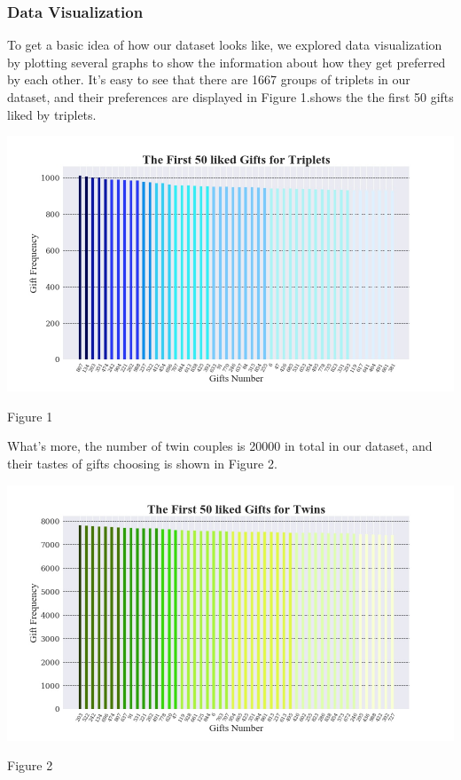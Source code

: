 \documentclass[12pt]{article}
\begin{document}
\subsubsection{Data Visualization}
To get a basic idea of how our dataset looks like, we explored data visualization by plotting several graphs to show the information about how they get preferred by each other.
It's easy to see that there are 1667 groups of triplets in our dataset, and their preferences are displayed in Figure 1.shows the the first 50 gifts liked by triplets.
\begin{center}
\includegraphics[width=\linewidth]{Gift_Freq_Triplets.jpg}
\caption{Figure 1}
\end{center}
What's more, the number of twin couples is 20000 in total in our dataset, and their tastes of gifts choosing is shown in Figure 2.
\begin{center}
\includegraphics[width=\linewidth]{Gift_Freq_Twins.jpg}
\caption{Figure 2}
\end{center}

\end{document}
